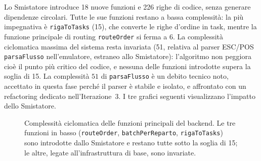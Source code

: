 Lo Smistatore introduce 18 nuove funzioni e 226 righe di codice, senza generare
dipendenze circolari. Tutte le sue funzioni restano a bassa complessità: la più
impegnativa è \texttt{rigaToTasks} (15), che converte le righe d'ordine in task,
mentre la funzione principale di routing \texttt{routeOrder} si ferma a 6. La
complessità ciclomatica massima del sistema resta invariata (51, relativa al parser
ESC/POS \texttt{parsaFlusso} nell'emulatore, estraneo allo Smistatore): l'algoritmo
non peggiora cioè il punto più critico del codice, e nessuna delle funzioni
introdotte supera la soglia di 15. La complessità $51$ di \texttt{parsaFlusso} è un
debito tecnico noto, accettato in questa fase perché il parser è stabile e isolato,
e affrontato con un refactoring dedicato nell'Iterazione~3. I tre grafici seguenti
visualizzano l'impatto dello Smistatore.


\begin{figure}[H]
    \centering
    \caption{Complessità ciclomatica delle funzioni principali del backend. Le tre
    funzioni in basso (\texttt{routeOrder}, \texttt{batchPerReparto},
    \texttt{rigaToTasks}) sono introdotte dallo Smistatore e restano tutte sotto la
    soglia di 15; le altre, legate all'infrastruttura di base, sono invariate.}
    \label{fig:cc-smistatore}
\end{figure}

